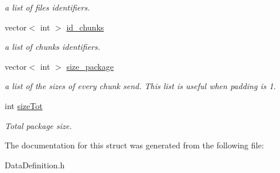 \begin{DoxyCompactItemize}
\begin{DoxyCompactList}\small\item\em a list of files identifiers. \end{DoxyCompactList}\item 
\hypertarget{structHEADER__TRANSMISSION_a3fa5dd88f6fc08f8c64eaee74408ce0e}{vector$<$ int $>$ \hyperlink{structHEADER__TRANSMISSION_a3fa5dd88f6fc08f8c64eaee74408ce0e}{id\-\_\-chunks}}\label{structHEADER__TRANSMISSION_a3fa5dd88f6fc08f8c64eaee74408ce0e}

\begin{DoxyCompactList}\small\item\em a list of chunks identifiers. \end{DoxyCompactList}\item 
\hypertarget{structHEADER__TRANSMISSION_a08672f07c936f6bc4127fe255ea0ce7e}{vector$<$ int $>$ \hyperlink{structHEADER__TRANSMISSION_a08672f07c936f6bc4127fe255ea0ce7e}{size\-\_\-package}}\label{structHEADER__TRANSMISSION_a08672f07c936f6bc4127fe255ea0ce7e}

\begin{DoxyCompactList}\small\item\em a list of the sizes of every chunk send. This list is useful when padding is 1. \end{DoxyCompactList}\item 
\hypertarget{structHEADER__TRANSMISSION_a0654a40688064ef0925896891de48b43}{int \hyperlink{structHEADER__TRANSMISSION_a0654a40688064ef0925896891de48b43}{size\-Tot}}\label{structHEADER__TRANSMISSION_a0654a40688064ef0925896891de48b43}

\begin{DoxyCompactList}\small\item\em Total package size. \end{DoxyCompactList}\end{DoxyCompactItemize}


The documentation for this struct was generated from the following file\-:\begin{DoxyCompactItemize}
\item 
Data\-Definition.\-h\end{DoxyCompactItemize}

